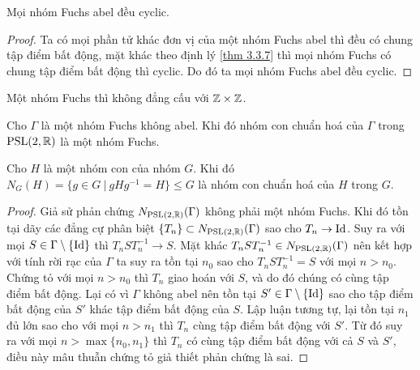 \begin{thm}\label{thm 3.3.11}
    Mọi nhóm Fuchs abel đều cyclic.
\end{thm}
\begin{proof}
    Ta có mọi phần tử khác đơn vị của một nhóm Fuchs abel thì đều có chung tập điểm bất động, mặt khác theo định lý \ref{thm 3.3.7} thì mọi nhóm Fuchs có chung tập điểm bất động thì cyclic. Do đó ta mọi nhóm Fuchs abel đều cyclic.
\end{proof}
\begin{cor}
    Một nhóm Fuchs thì không đẳng cấu với $\mathbb{Z} \times \mathbb{Z}$.
\end{cor}

\begin{thm}\label{thm 3.3.13}
    Cho $\Gamma$ là một nhóm Fuchs không abel. Khi đó nhóm con chuẩn hoá của $\Gamma$ trong $\operatorname{PSL}(2,\mathbb{R})$ là một nhóm Fuchs.
\end{thm}
\begin{remark*}
    Cho $H$ là một nhóm con của nhóm $G$. Khi đó $N_G(H) = \{g \in G~|~gHg^{-1} = H\} \leq G$ là nhóm con chuẩn hoá của $H$ trong $G$.
\end{remark*}
\begin{proof}
    Giả sử phản chứng $N_{\operatorname{PSL}(2,\mathbb{R})}(\Gamma)$ không phải một nhóm Fuchs. Khi đó tồn tại dãy các đẳng cự phân biệt $\{T_n\} \subset N_{\operatorname{PSL}(2,\mathbb{R})}(\Gamma)$ sao cho $T_n \to \operatorname{Id}$. Suy ra với mọi $S \in \Gamma\setminus\{\operatorname{Id}\}$ thì $T_nST_n^{-1}\to S$. Mặt khác $T_nST_n^{-1} \in N_{\operatorname{PSL}(2,\mathbb{R})}(\Gamma)$ nên kết hợp với tính rời rạc của $\Gamma$ ta suy ra tồn tại $n_0$ sao cho $T_nST_n^{-1} = S$ với mọi $n>n_0$. Chứng tỏ với mọi $n > n_0$ thì $T_n$ giao hoán với $S$, và do đó chúng có cùng tập điểm bất động. Lại có vì $\Gamma$ không abel nên tồn tại $S' \in \Gamma\setminus\{\operatorname{Id}\}$ sao cho tập điểm bất động của $S'$ khác tập điểm bất động của $S$. Lập luận tương tự, lại tồn tại $n_1$ đủ lớn sao cho với mọi $n>n_1$ thì $T_n$ cùng tập điểm bất động với $S'$. Từ đó suy ra với mọi $n > \max\{n_0,n_1\}$ thì $T_n$ có cùng tập điểm bất động với cả $S$ và $S'$, điều này mâu thuẫn chứng tỏ giả thiết phản chứng là sai.
\end{proof}
